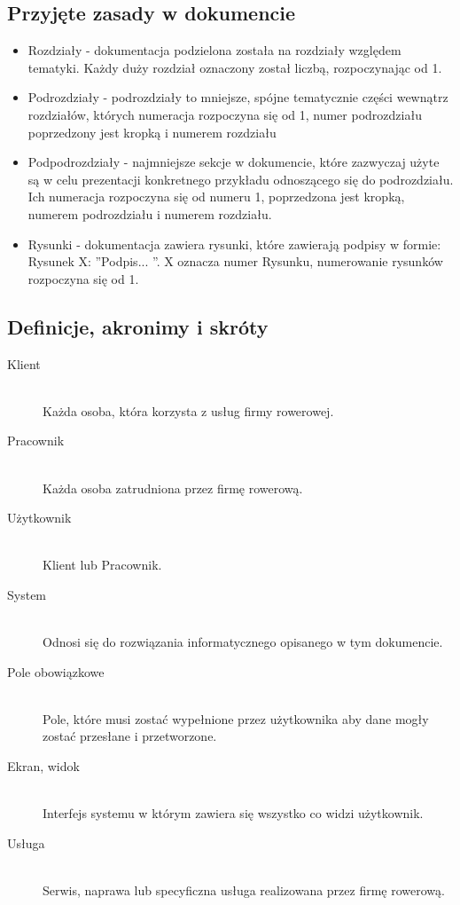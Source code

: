 \documentclass[a4paper,20pt]{article}
\begin{document}
\subsection{Przyjęte zasady w dokumencie}

\begin{itemize}
\item Rozdziały - dokumentacja podzielona została na rozdziały względem tematyki. Każdy duży rozdział oznaczony został liczbą, rozpoczynając od 1.

\item Podrozdziały - podrozdziały to mniejsze, spójne tematycznie części wewnątrz rozdziałów, których numeracja rozpoczyna się od 1, numer podrozdziału poprzedzony jest kropką i numerem rozdziału

\item Podpodrozdziały - najmniejsze sekcje w dokumencie, które zazwyczaj użyte są w celu prezentacji konkretnego przykładu odnoszącego się do podrozdziału. Ich numeracja rozpoczyna się od numeru 1, poprzedzona jest kropką, numerem podrozdziału i numerem rozdziału. 

\item Rysunki - dokumentacja zawiera rysunki, które zawierają podpisy w formie: Rysunek X: ''Podpis... ''. X oznacza numer Rysunku, numerowanie rysunków rozpoczyna się od 1. 
\end{itemize}


\subsection{Definicje, akronimy i skróty}

\begin{description}
  \item[Klient] \hfill \\ 
  	Każda osoba, która korzysta z usług firmy rowerowej. 
  \item[Pracownik] \hfill \\ 
  	Każda osoba zatrudniona przez firmę rowerową.
  \item[Użytkownik] \hfill \\ 
  	Klient lub Pracownik.
  \item[System] \hfill \\ 
  	Odnosi się do rozwiązania informatycznego opisanego w tym dokumencie.	
  \item[Pole obowiązkowe] \hfill \\ 
  	Pole, które musi zostać wypełnione przez użytkownika aby dane mogły zostać przesłane i przetworzone.
  \item[Ekran, widok] \hfill \\ 
  	Interfejs systemu w którym zawiera się wszystko co widzi użytkownik.	
  \item[Usługa] \hfill \\ 
  	Serwis, naprawa lub specyficzna usługa realizowana przez firmę rowerową.		
\end{description}
\end{document}
